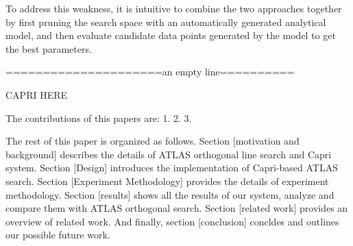 \par
To address this weakness, it is intuitive to combine the two approaches together by first pruning the search
space with an automatically generated analytical model, and then evaluate candidate data points generated by the model
to get the best parameters.
\par
=====================an empty line==========
\par
CAPRI HERE

The contributions of this papers are:
1.
2.
3.

\par
The rest of this paper is organized as follows. Section [motivation and background] describes the details of ATLAS
orthogonal line search and Capri system.
Section [Design] introduces the implementation of Capri-based ATLAS search.
Section [Experiment Methodology] provides the details of experiment methodology.
Section [results] shows all the results of our system, analyze and compare them with ATLAS orthogonal search. 
Section [related work] provides an overview of related work.
And finally, section [conclusion] concldes and outlines our possible future work.








